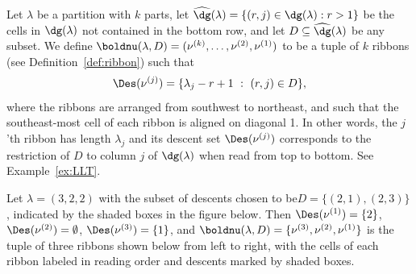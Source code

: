 Let $\lambda$ be a partition with $k$ parts, let $\widehat{\dg}(\lambda)=\{(r,j) \in \dg(\lambda): r>1\}$ 
be the cells in $\dg(\lambda)$ not contained in the bottom row, and let $D\subseteq \widehat{\dg}(\lambda)$ be any subset. We define $\boldnu(\lambda,D)=(\nu^{(k)},\ldots,\nu^{(2)},\nu^{(1)})$ to be a tuple of $k$ ribbons (see Definition~\ref{def:ribbon}) such that 
\[
\Des(\nu^{(j)})=\{\lambda_j-r+1\ :\ (r,j)\in D\},
\]
where the ribbons are arranged from southwest to northeast, and such that the southeast-most cell of each ribbon is aligned on diagonal 1. In other words, the $j$'th ribbon has length $\lambda_j$ and its descent set $\Des(\nu^{(j)})$ corresponds to the restriction of $D$ to column $j$ of $\dg(\lambda)$ when read from top to bottom. See Example~\ref{ex:LLT}.

\begin{example}\label{ex:LLT}
Let $\lambda=(3,2,2)$ with the subset of descents chosen to be\linebreak[4] $D=\{(2,1),(2,3)\}$, indicated by the shaded boxes in the figure below. Then $\Des(\nu^{(1)}) = \{2\}$, $\Des(\nu^{(2)})=\emptyset$, $\Des(\nu^{(3)})=\{1\}$, and $\boldnu(\lambda,D)=\{\nu^{(3)},\nu^{(2)},\nu^{(1)}\}$ is the tuple of three ribbons shown below from left to right, with the cells of each ribbon labeled in reading order and descents marked by shaded boxes. 

\begin{center} 
\qquad\qquad
{}
\end{center}
\end{example}

